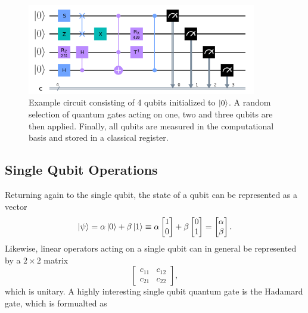 \begin{figure}[htp]
    \centering
    \includegraphics[width=10cm]{latex/figures/example_circuit.png}
    \caption{Example circuit consisting of 4 qubits initialized to $\ket{0}$. A random selection of quantum gates acting on one, two and three qubits are then applied. Finally, all qubits are measured in the computational basis and stored in a classical register.}
    \label{fig:exampleCircuit}
\end{figure}

\subsection{Single Qubit Operations}\label{sec:ControlledOperations}

Returning again to the single qubit, the state of a qubit can be represented as a vector
\begin{equation}\label{eq:vectorRepresentation}
\ket{\psi} = \alpha \ket{0} + \beta \ket{1} \equiv \alpha 
    \begin{bmatrix}
        1 \\
        0
    \end{bmatrix} + 
    \beta \begin{bmatrix}
        0 \\
        1
    \end{bmatrix}
    =
    \begin{bmatrix}
        \alpha \\
        \beta
    \end{bmatrix}.
\end{equation}
Likewise, linear operators acting on a single qubit can in general be represented by a $2\times 2$ matrix 
\begin{equation}\label{eq:matrixRepresentation}
    \begin{bmatrix}
        c_{11} & c_{12} \\
        c_{21} & c_{22}
    \end{bmatrix},
\end{equation}
which is unitary. A highly interesting single qubit quantum gate is the Hadamard gate, which is formualted as 

